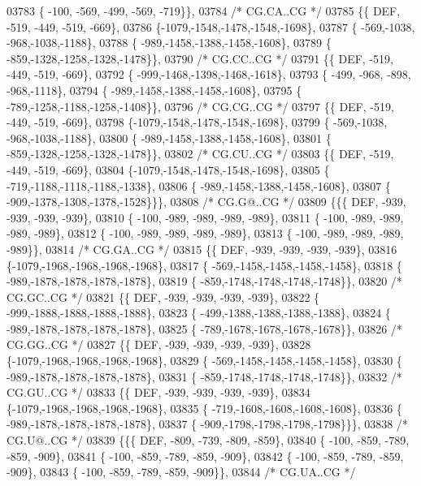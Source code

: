 \begin{DoxyCode}
03783 \{ -100, -569, -499, -569, -719\}\},
03784 \textcolor{comment}{/* CG.CA..CG */}
03785 \{\{  DEF, -519, -449, -519, -669\},
03786 \{-1079,-1548,-1478,-1548,-1698\},
03787 \{ -569,-1038, -968,-1038,-1188\},
03788 \{ -989,-1458,-1388,-1458,-1608\},
03789 \{ -859,-1328,-1258,-1328,-1478\}\},
03790 \textcolor{comment}{/* CG.CC..CG */}
03791 \{\{  DEF, -519, -449, -519, -669\},
03792 \{ -999,-1468,-1398,-1468,-1618\},
03793 \{ -499, -968, -898, -968,-1118\},
03794 \{ -989,-1458,-1388,-1458,-1608\},
03795 \{ -789,-1258,-1188,-1258,-1408\}\},
03796 \textcolor{comment}{/* CG.CG..CG */}
03797 \{\{  DEF, -519, -449, -519, -669\},
03798 \{-1079,-1548,-1478,-1548,-1698\},
03799 \{ -569,-1038, -968,-1038,-1188\},
03800 \{ -989,-1458,-1388,-1458,-1608\},
03801 \{ -859,-1328,-1258,-1328,-1478\}\},
03802 \textcolor{comment}{/* CG.CU..CG */}
03803 \{\{  DEF, -519, -449, -519, -669\},
03804 \{-1079,-1548,-1478,-1548,-1698\},
03805 \{ -719,-1188,-1118,-1188,-1338\},
03806 \{ -989,-1458,-1388,-1458,-1608\},
03807 \{ -909,-1378,-1308,-1378,-1528\}\}\},
03808 \textcolor{comment}{/* CG.G@..CG */}
03809 \{\{\{  DEF, -939, -939, -939, -939\},
03810 \{ -100, -989, -989, -989, -989\},
03811 \{ -100, -989, -989, -989, -989\},
03812 \{ -100, -989, -989, -989, -989\},
03813 \{ -100, -989, -989, -989, -989\}\},
03814 \textcolor{comment}{/* CG.GA..CG */}
03815 \{\{  DEF, -939, -939, -939, -939\},
03816 \{-1079,-1968,-1968,-1968,-1968\},
03817 \{ -569,-1458,-1458,-1458,-1458\},
03818 \{ -989,-1878,-1878,-1878,-1878\},
03819 \{ -859,-1748,-1748,-1748,-1748\}\},
03820 \textcolor{comment}{/* CG.GC..CG */}
03821 \{\{  DEF, -939, -939, -939, -939\},
03822 \{ -999,-1888,-1888,-1888,-1888\},
03823 \{ -499,-1388,-1388,-1388,-1388\},
03824 \{ -989,-1878,-1878,-1878,-1878\},
03825 \{ -789,-1678,-1678,-1678,-1678\}\},
03826 \textcolor{comment}{/* CG.GG..CG */}
03827 \{\{  DEF, -939, -939, -939, -939\},
03828 \{-1079,-1968,-1968,-1968,-1968\},
03829 \{ -569,-1458,-1458,-1458,-1458\},
03830 \{ -989,-1878,-1878,-1878,-1878\},
03831 \{ -859,-1748,-1748,-1748,-1748\}\},
03832 \textcolor{comment}{/* CG.GU..CG */}
03833 \{\{  DEF, -939, -939, -939, -939\},
03834 \{-1079,-1968,-1968,-1968,-1968\},
03835 \{ -719,-1608,-1608,-1608,-1608\},
03836 \{ -989,-1878,-1878,-1878,-1878\},
03837 \{ -909,-1798,-1798,-1798,-1798\}\}\},
03838 \textcolor{comment}{/* CG.U@..CG */}
03839 \{\{\{  DEF, -809, -739, -809, -859\},
03840 \{ -100, -859, -789, -859, -909\},
03841 \{ -100, -859, -789, -859, -909\},
03842 \{ -100, -859, -789, -859, -909\},
03843 \{ -100, -859, -789, -859, -909\}\},
03844 \textcolor{comment}{/* CG.UA..CG */}

\end{DoxyCode}
